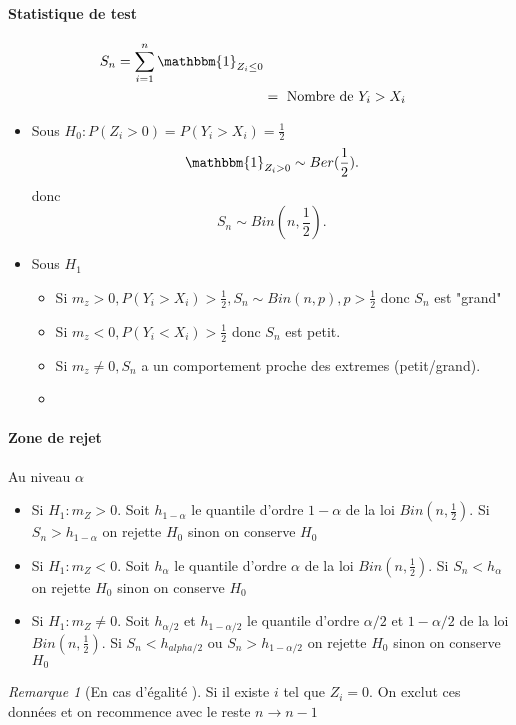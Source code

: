 \documentclass{article}
\theoremstyle{plain}%
\theoremstyle{definition}
\theoremstyle{remark}
\newtheorem*{rem}{Remarque}
\begin{document}
\paragraph*{Statistique de test}
\begin{align*}
    S_n = \sum_{i=1}^{n}\mathbbm{1}_{Z_i \leq 0} \\
    &= \text{ Nombre de } Y_i > X_i
\end{align*}

\begin{itemize}
    \item Sous $ H_0 : P(Z_i > 0) = P(Y_i > X_i) = \frac{1}{2} $ 
    \[
        \mathbbm{1}_{Z_i > 0} \sim Ber(\frac{1}{2})
    .\]
    donc 
    \[
        S_n \sim Bin(n,\frac{1}{2})
    .\]

    \item Sous $ H_1 $ \begin{itemize}
        \item Si $ m_z > 0, P(Y_i > X_i) > \frac{1}{2}, S_n \sim Bin(n,p), p> \frac{1}{2} $ donc $ S_n $ est "grand"
        \item Si $ m_z < 0, P(Y_i < X_i) > \frac{1}{2} $ donc $ S_n $ est petit.
        \item Si $ m_z \neq  0, S_n $ a un comportement proche des extremes (petit/grand).
        \item 
    \end{itemize}
\end{itemize}

\paragraph*{Zone de rejet}
Au niveau $ \alpha  $ \begin{itemize}
    \item Si $ H_1 : m_Z > 0 $. Soit $ h_{1 - \alpha } $ le quantile d'ordre $ 1 - \alpha  $ de la loi $ Bin(n,\frac{1}{2}) $. Si $ S_n > h_{1 - \alpha } $ on rejette $ H_0 $ sinon on conserve $ H_0 $ 
    \item Si $ H_1 : m_Z < 0 $. Soit $ h_{\alpha } $ le quantile d'ordre $ \alpha  $ de la loi $ Bin(n,\frac{1}{2}) $. Si $ S_n < h_{\alpha } $ on rejette $ H_0 $ sinon on conserve $ H_0 $ 
    \item Si $ H_1 : m_Z \neq 0 $. Soit $ h_{\alpha/2 } $ et $ h_{1 - \alpha /2} $  le quantile d'ordre $ \alpha /2 $ et $ 1 - \alpha /2 $ de la loi $ Bin(n,\frac{1}{2}) $. Si $ S_n < h_{alpha /2 } $ ou $ S_n > h_{1 - \alpha /2} $ on rejette $ H_0 $ sinon on conserve $ H_0 $ 
\end{itemize}
\begin{rem}[En cas d'égalité ]
    Si il existe $ i $ tel que $ Z_i = 0 $. On exclut ces données et on recommence avec le reste $ n \to n-1 $ 
\end{rem}
\end{document}
